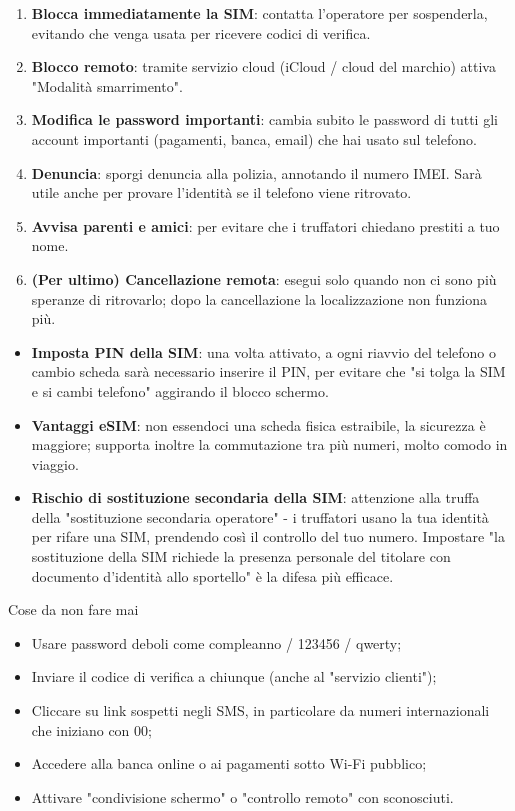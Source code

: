 \begin{enumerate}
  \item \textbf{Blocca immediatamente la SIM}: contatta l'operatore per sospenderla, evitando che venga usata per ricevere codici di verifica.
  \item \textbf{Blocco remoto}: tramite servizio cloud (iCloud / cloud del marchio) attiva "Modalità smarrimento".
  \item \textbf{Modifica le password importanti}: cambia subito le password di tutti gli account importanti (pagamenti, banca, email) che hai usato sul telefono.
  \item \textbf{Denuncia}: sporgi denuncia alla polizia, annotando il numero IMEI. Sarà utile anche per provare l'identità se il telefono viene ritrovato.
  \item \textbf{Avvisa parenti e amici}: per evitare che i truffatori chiedano prestiti a tuo nome.
  \item \textbf{(Per ultimo) Cancellazione remota}: esegui solo quando non ci sono più speranze di ritrovarlo; dopo la cancellazione la localizzazione non funziona più.
\end{enumerate}


\begin{itemize}
  \item \textbf{Imposta PIN della SIM}: una volta attivato, a ogni riavvio del telefono o cambio scheda sarà necessario inserire il PIN, per evitare che "si tolga la SIM e si cambi telefono" aggirando il blocco schermo.
  \item \textbf{Vantaggi eSIM}: non essendoci una scheda fisica estraibile, la sicurezza è maggiore; supporta inoltre la commutazione tra più numeri, molto comodo in viaggio.
  \item \textbf{Rischio di sostituzione secondaria della SIM}: attenzione alla truffa della "sostituzione secondaria operatore" - i truffatori usano la tua identità per rifare una SIM, prendendo così il controllo del tuo numero. Impostare "la sostituzione della SIM richiede la presenza personale del titolare con documento d'identità allo sportello" è la difesa più efficace.
\end{itemize}

\begin{tcbwarn}{Cose da non fare mai}
\begin{itemize}
  \item Usare password deboli come compleanno / 123456 / qwerty;
  \item Inviare il codice di verifica a chiunque (anche al "servizio clienti");
  \item Cliccare su link sospetti negli SMS, in particolare da numeri internazionali che iniziano con 00;
  \item Accedere alla banca online o ai pagamenti sotto Wi-Fi pubblico;
  \item Attivare "condivisione schermo" o "controllo remoto" con sconosciuti.
\end{itemize}

\end{tcbwarn}

